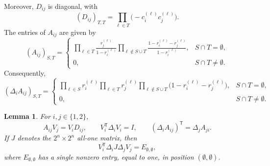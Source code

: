 \documentclass[11pt]{article}
\numberwithin{equation}{section}
\newtheorem{lemma}[theorem]{Lemma}
\theoremstyle{definition}
\theoremstyle{remark}
\begin{document}
Moreover, $D_{ij}$ is diagonal, with
$$
 (D_{ij})_{T,T}
 =
 \prod_{\ell\in T}
 \bigl(-c_i^{(\ell)}c_j^{(\ell)}\bigr).
$$
The entries of $A_{ij}$ are given by
$$
 (A_{ij})_{S,T}
 =
 \begin{cases}
 \displaystyle
 \prod_{\ell\in T}
 \frac{r_j^{(\ell)}}{1-r_i^{(\ell)}}
 \prod_{\ell\notin S\cup T}
 \frac{1-r_i^{(\ell)}-r_j^{(\ell)}}
      {1-r_i^{(\ell)}},
 & S\cap T=\emptyset,\\[12pt]
 0,
 & S\cap T\neq\emptyset.
 \end{cases}
$$
Consequently,
$$
 (\Delta_iA_{ij})_{S,T}
 =
 \begin{cases}
 \displaystyle
 \prod_{\ell\in S}r_i^{(\ell)}
 \prod_{\ell\in T}r_j^{(\ell)}
 \prod_{\ell\notin S\cup T}
 \bigl(1-r_i^{(\ell)}-r_j^{(\ell)}\bigr),
 & S\cap T=\emptyset,\\[10pt]
 0,
 & S\cap T\neq\emptyset.
 \end{cases}
$$

\begin{lemma}\label{lem:semidefinite-identities}
For $i,j\in\{1,2\}$,
$$
 A_{ij}V_j=V_iD_{ij},
 \qquad
 V_i^{\mathsf T}\Delta_iV_i=I,
 \qquad
 (\Delta_iA_{ij})^{\mathsf T}=\Delta_jA_{ji}.
$$
If $ J$ denotes the $2^n\times2^n$ all-one matrix, then
$$
 V_i^{\mathsf T}\Delta_i J\Delta_jV_j
 =
 E_{\emptyset,\emptyset},
$$
where $E_{\emptyset,\emptyset}$ has a single nonzero entry,
equal to one, in position $(\emptyset,\emptyset)$.
\end{lemma}
\end{document}
